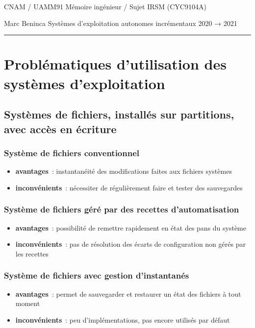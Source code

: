 \documentclass[10pt]{article}
\newcommand{\hr}{\rule{\textwidth}{1pt}}
\newenvironment{itmz}{\begin{itemize}
\setlength{\itemsep}{0em}
}{\end{itemize}}
\begin{document}
CNAM / UAMM91 \hfill Mémoire ingénieur / Sujet \hfill IRSM (CYC9104A)

Marc Beninca \hfill Systèmes d’exploitation autonomes incrémentaux \hfill 2020 → 2021

\hr

\section{Problématiques d’utilisation des systèmes d’exploitation}

\subsection{Systèmes de fichiers, installés sur partitions, avec accès en écriture}

\subsubsection{Système de fichiers conventionnel}

\begin{itmz}
\item{\textbf{avantages} : instantanéité des modifications faites aux fichiers systèmes}
\item{\textbf{inconvénients} : nécessiter de régulièrement faire et tester des sauvegardes}
\end{itmz}

\subsubsection{Système de fichiers géré par des recettes d’automatisation}

\begin{itmz}
\item{\textbf{avantages} : possibilité de remettre rapidement en état des pans du système}
\item{\textbf{inconvénients} : pas de résolution des écarts de configuration non gérés par les recettes}
\end{itmz}

\subsubsection{Système de fichiers avec gestion d’instantanés}

\begin{itmz}
\item{\textbf{avantages} : permet de sauvegarder et restaurer un état des fichiers à tout moment}
\item{\textbf{inconvénients} : peu d’implémentations, pas encore utilisés par défaut}
\end{itmz}
\end{document}
